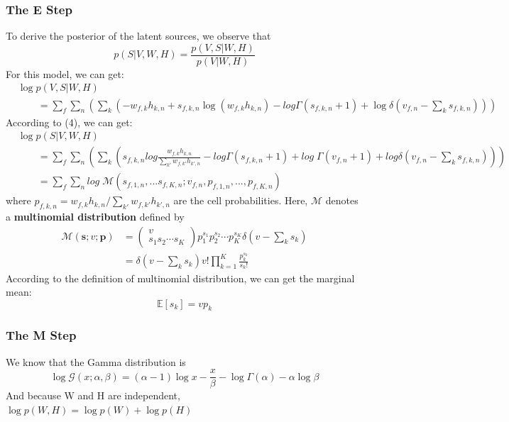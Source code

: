 \documentclass[12pt]{article}
\begin{document}
\subsubsection*{The E Step} To derive the posterior of the latent sources, we observe that
\begin{equation}
p(S|V,W,H) = \frac{p(V,S|W,H)}{p(V|W,H)}
\end{equation}
For this model, we can get:
\begin{align*}
& \log p(V,S|W,H) \\
& \qquad  = \sum_f \sum_n\left(\sum_k(-w_{f,k}h_{k,n}+s_{f,k,n}\log (w_{f,k}h_{k,n})-log\Gamma (s_{f,k,n}+1)+\log \delta(v_{f,n}-\sum_k s_{f,k,n}))\right)
\end{align*}
According to (4), we can get:
\begin{align*}
&\log p(S|V,W,H) \\
&\qquad = \sum_f \sum_n\left(\sum_k (s_{f,k,n}log\frac{w_{f,k}h_{k,n}}{\sum_{k'} w_{f,k'}h_{k',n}} - log\Gamma(s_{f,k,n} + 1) + log\;\Gamma(v_{f,n} + 1) +log\delta (v_{f,n} - \sum_k s_{f,k,n}))\right) \\
&\qquad = \sum_f \sum_n log\;\mathcal{M}(s_{f,1,n},...s_{f,K,n};v_{f,n}, p_{f,1,n},...,p_{f,K,n})
\end{align*}
where $p_{f,k,n} = w_{f,k}h_{k,n} / \sum_{k'} w_{f,k'}h_{k',n}$ are the cell probabilities. Here, $\mathcal{M}$ denotes a \textbf{multinomial distribution} defined by
\begin{align*}
\mathcal{M}(\textbf{s};v;\textbf{p})
&=\begin{pmatrix}v \\s_1s_2\cdots s_K\end{pmatrix} p_1^{s_1}p_2^{s_2}\cdots p_K^{s_K}\delta(v - \sum_k s_k) \\
&= \delta(v - \sum_k s_k)v!\prod_{k=1}^K\frac{p_k^{s_k}}{s_k!}
\end{align*}
According to the definition of  multinomial distribution, we can get the marginal mean:
\begin{equation}
\mathbb{E}[s_k] = v p_k
\end{equation}

\subsubsection*{The M Step}

We know that the Gamma distribution is
\begin{equation}
\log \mathcal{G}(x;\alpha, \beta) = (\alpha -1) \log x - \frac{x}{\beta} - \log \Gamma (\alpha) -\alpha \log \beta
\end{equation}
And because W and H are independent, $\log p(W,H) = \log p(W) + \log p(H)$
\end{document}
